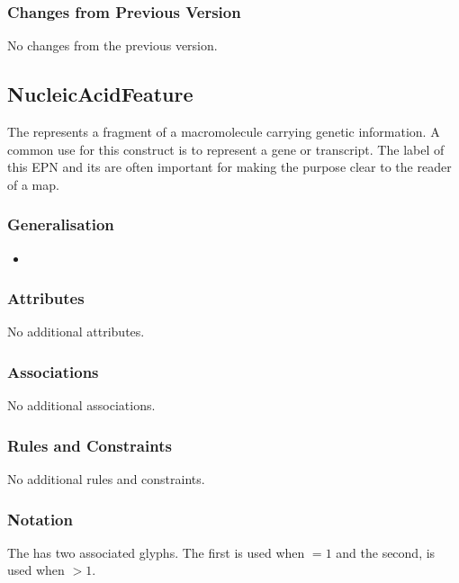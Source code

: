 \subsubsection{Changes from Previous Version}

No changes from the previous version.

\subsection{NucleicAcidFeature}
\label{sec:genetic}

The  represents a fragment of a macromolecule carrying genetic information.
A common use for this construct is to represent a gene or transcript.
The label of this EPN and its  are often
important for making the purpose clear to the reader of a map.

\subsubsection{Generalisation}

\begin{itemize}
\item {}
\end{itemize}

\subsubsection{Attributes}

No additional attributes.

\subsubsection{Associations}

No additional associations.

\subsubsection{Rules and Constraints}

No additional rules and constraints.

\subsubsection{Notation}

The  has two associated glyphs. The
first  is used when
 $=1$ and the second,  is used when  $>1$.

